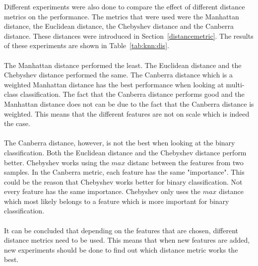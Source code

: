 \noindent Different experiments were also done to compare the effect of different distance metrics on the performance. The metrics that were used were the Manhattan distance, the Euclidean distance, the Chebyshev distance and the Canberra distance. These distances were introduced in Section~\ref{distancemetric}. The results of these experiments are shown in Table~\ref{tab:knn:dis}. \\
\\
The Manhattan distance performed the least. The Euclidean distance and the Chebyshev distance performed the same. The Canberra distance which is a weighted Manhattan distance has the best performance when looking at multi-class classification. The fact that the Canberra distance performs good and the Manhattan distance does not can be due to the fact that the Canberra distance is weighted. This means that the different features are not on scale which is indeed the case. \\
\\
The Canberra distance, however, is not the best when looking at the binary classification. Both the Euclidean distance and the Chebyshev distance perform better. Chebyshev works using the $max$ distanc between the features from two samples. In the Canberra metric, each feature has the same "importance". This could be the reason that Chebyshev works better for binary classification. Not every feature has the same importance. Chebyshev only uses the $max$ distance which most likely belongs to a feature which is more important for binary classification.\\
\\
It can be concluded that depending on the features that are chosen, different distance metrics need to be used. This means that when new features are added, new experiments should be done to find out which distance metric works the best.

